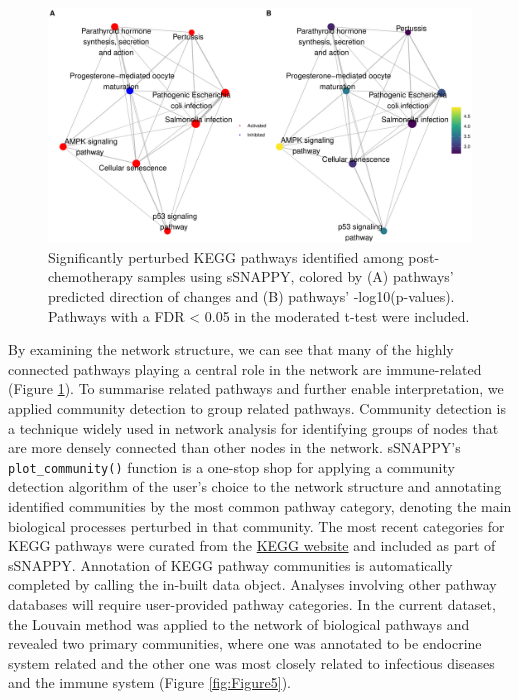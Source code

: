 \documentclass[9pt,a4paper,]{extarticle}
\begin{document}
\begin{figure}

{\centering \includegraphics[width=1\linewidth]{sSNAPPY_paper_files/figure-latex/Figure4-1} 

}

\caption{Significantly perturbed KEGG pathways identified among post-chemotherapy samples using sSNAPPY, colored by (A) pathways’ predicted direction of changes and (B) pathways’ -log10(p-values). Pathways with a FDR < 0.05 in the moderated t-test were included.}\label{fig:Figure4}
\end{figure}

By examining the network structure, we can see that many of the highly connected pathways playing a central role in the network are immune-related (Figure \ref{fig:Figure4}).
To summarise related pathways and further enable interpretation, we applied community detection to group related pathways.
Community detection is a technique widely used in network analysis for identifying groups of nodes that are more densely connected than other nodes in the network\citep{Newman2004}.
sSNAPPY's \texttt{plot\_community()} function is a one-stop shop for applying a community detection algorithm of the user's choice to the network structure and annotating identified communities by the most common pathway category, denoting the main biological processes perturbed in that community.
The most recent categories for KEGG pathways were curated from the \href{https://www.genome.jp/kegg/pathway.html}{KEGG website} and included as part of sSNAPPY.
Annotation of KEGG pathway communities is automatically completed by calling the in-built data object.
Analyses involving other pathway databases will require user-provided pathway categories.
In the current dataset, the Louvain method was applied to the network of biological pathways and revealed two primary communities, where one was annotated to be endocrine system related and the other one was most closely related to infectious diseases and the immune system (Figure \ref{fig:Figure5}).
\end{document}

